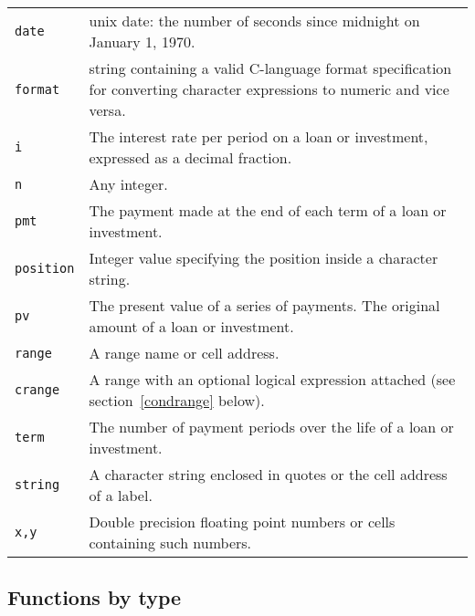\documentclass[titlepage]{article}
\begin{document}
\begin{center}
\begin{tabular}{lp{5in}}
\texttt{date} & unix date: the number of
    seconds since midnight on January 1, 1970.\\
\texttt{format} & string containing a valid C-language
    format specification for converting character expressions to
    numeric and vice versa.\\
\texttt{i} & The interest rate per period on a loan or investment,
    expressed as a decimal fraction.\\
\texttt{n} & Any integer.\\
\texttt{pmt} & The payment made at the end of each term of a loan
    or investment.\\
\texttt{position} & Integer value specifying the position inside
    a character string.\\
\texttt{pv } & The present value of a series of payments.  The
    original amount of a loan or investment.\\
\texttt{range} & A range name or cell address.\\
\texttt{crange} & A range with an optional
    logical expression attached (see section~\ref{condrange} below).\\
\texttt{term} & The number of payment periods over the life of a
    loan or investment.\\
\texttt{string} & A character string enclosed in quotes or the cell
    address of a label.\\
\texttt{x,y} & Double precision floating point numbers or cells
    containing such numbers.\\
\end{tabular}
\end{center}

\subsection{Functions by type}
\end{document}
